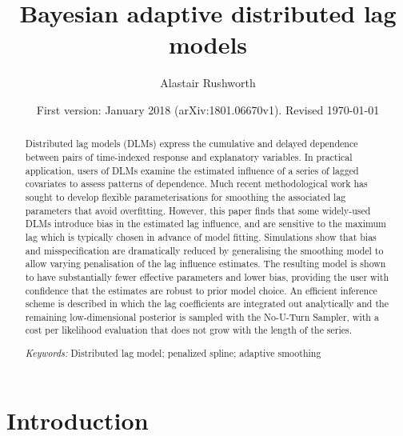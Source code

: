 \documentclass[11pt]{article}
\title{Bayesian adaptive distributed lag models}
\author{Alastair Rushworth}
\date{First version: January 2018 (arXiv:1801.06670v1). Revised \today}
\begin{document}
\maketitle

\begin{abstract}
Distributed lag models (DLMs) express the cumulative and delayed dependence
between pairs of time-indexed response and explanatory variables. In practical
application, users of DLMs examine the estimated influence of a series of
lagged covariates to assess patterns of dependence. Much recent methodological
work has sought to develop flexible parameterisations for smoothing the
associated lag parameters that avoid overfitting. However, this paper finds
that some widely-used DLMs introduce bias in the estimated lag influence, and
are sensitive to the maximum lag which is typically chosen in advance of model
fitting. Simulations show that bias and misspecification are dramatically
reduced by generalising the smoothing model to allow varying penalisation of
the lag influence estimates. The resulting model is shown to have substantially
fewer effective parameters and lower bias, providing the user with confidence
that the estimates are robust to prior model choice. An efficient inference
scheme is described in which the lag coefficients are integrated out
analytically and the remaining low-dimensional posterior is sampled with the
No-U-Turn Sampler, with a cost per likelihood evaluation that does not grow
with the length of the series.

\medskip\noindent
\textit{Keywords:} Distributed lag model; penalized spline; adaptive smoothing
\end{abstract}

\doublespacing

\section{Introduction}
\label{sec:intro}
\end{document}
